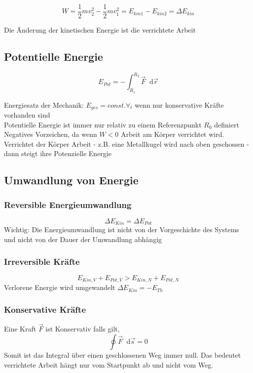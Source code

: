 \documentclass[a4paper,12pt]{report}
\newcommand*\diff{\mathop{}\!\mathrm{d}}
\begin{document}
\begin{equation*}
W = \frac{1}{2}mv_2^2- \frac{1}{2}mv_1^2 = E_{kin1}-E_{kin2} = \Delta E_{kin}
\end{equation*}


Die Änderung der kinetischen Energie ist die verrichtete Arbeit

\subsection{Potentielle Energie}
\begin{equation*}
E_{Pot} = - \int_{R_1}^{R_2}{\vec{F} \diff \vec{r} }
\end{equation*}

Energiesatz der Mechanik: $ E_{ges} = const. \forall_t $ wenn nur konservative Kräfte vorhanden sind\\

Potentielle Energie ist immer nur relativ zu einem Referenzpunkt $R_0$  definiert \\

Negatives Vorzeichen, da wenn $W < 0$ Arbeit am Körper verrichtet wird. Verrichtet der Körper Arbeit - z.B. eine Metallkugel wird nach oben geschossen - dann steigt ihre Potenzielle Energie

\subsection{Umwandlung von Energie}


\subsubsection{Reversible Energieumwandlung}
\begin{equation*}
\Delta E_{Kin} = \Delta E_{Pot}
\end{equation*}	
Wichtig: Die Energieumwandlung ist nicht von der Vorgeschichte des Systems und nicht von der Dauer der Umwandlung abhängig

\subsubsection{Irreversible Kräfte}
\begin{equation*}
E_{Kin,V} + E_{Pot,V} > E_{Kin,N} + E_{Pot,N}
\end{equation*}
Verlorene Energie wird umgewandelt $ \Delta E_{Kin} = - E_{Th} $ \\

\subsubsection{Konservative Kräfte}
Eine Kraft $\vec{F} $ ist Konservativ falls gilt, 
\begin{equation*}
\oint{\vec{F}}\diff \vec{s} = 0
\end{equation*}
Somit ist das Integral über einen geschlossenen Weg immer null. Das bedeutet verrichtete Arbeit hängt nur vom Startpunkt ab und nicht vom Weg. \\
\end{document}
